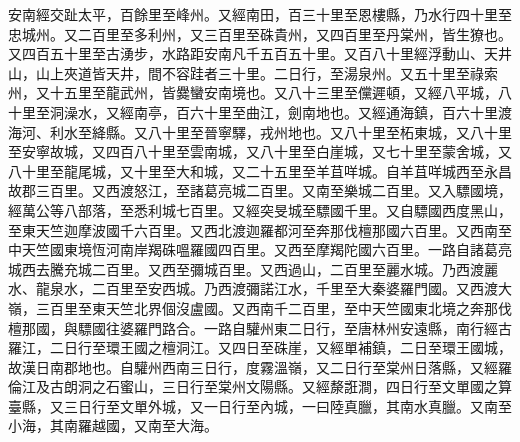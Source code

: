 \begin{pinyinscope}
 安南經交趾太平，百餘里至峰州。又經南田，百三十里至恩樓縣，乃水行四十里至忠城州。又二百里至多利州，又三百里至硃貴州，又四百里至丹棠州，皆生獠也。又四百五十里至古湧步，水路距安南凡千五百五十里。又百八十里經浮動山、天井山，山上夾道皆天井，間不容跬者三十里。二日行，至湯泉州。又五十里至祿索州，又十五里至龍武州，皆爨蠻安南境也。又八十三里至儻遲頓，又經八平城，八十里至洞澡水，又經南亭，百六十里至曲江，劍南地也。又經通海鎮，百六十里渡海河、利水至絳縣。又八十里至晉寧驛，戎州地也。又八十里至柘東城，又八十里至安寧故城，又四百八十里至雲南城，又八十里至白崖城，又七十里至蒙舍城，又八十里至龍尾城，又十里至大和城，又二十五里至羊苴咩城。自羊苴咩城西至永昌故郡三百里。又西渡怒江，至諸葛亮城二百里。又南至樂城二百里。又入驃國境，經萬公等八部落，至悉利城七百里。又經突旻城至驃國千里。又自驃國西度黑山，至東天竺迦摩波國千六百里。又西北渡迦羅都河至奔那伐檀那國六百里。又西南至中天竺國東境恆河南岸羯硃嗢羅國四百里。又西至摩羯陀國六百里。一路自諸葛亮城西去騰充城二百里。又西至彌城百里。又西過山，二百里至麗水城。乃西渡麗水、龍泉水，二百里至安西城。乃西渡彌諾江水，千里至大秦婆羅門國。又西渡大嶺，三百里至東天竺北界個沒盧國。又西南千二百里，至中天竺國東北境之奔那伐檀那國，與驃國往婆羅門路合。一路自驩州東二日行，至唐林州安遠縣，南行經古羅江，二日行至環王國之檀洞江。又四日至硃崖，又經單補鎮，二日至環王國城，故漢日南郡地也。自驩州西南三日行，度霧溫嶺，又二日行至棠州日落縣，又經羅倫江及古朗洞之石蜜山，三日行至棠州文陽縣。又經漦誑澗，四日行至文單國之算臺縣，又三日行至文單外城，又一日行至內城，一曰陸真臘，其南水真臘。又南至小海，其南羅越國，又南至大海。




\end{pinyinscope}
